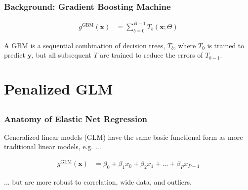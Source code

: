 \documentclass[11pt,aspectratio=169,hyperref={colorlinks}]{beamer}
\begin{document}
		\begin{frame}
		
			\frametitle{Background: Gradient Boosting Machine}			
				  			
			\begin{equation}
			\begin{aligned}\label{eq:gbm}
			g^{\text{GBM}}(\mathbf{x}) &= \sum_{b=0}^{B-1} T_b\left(\mathbf{x}; \Theta\right)
			\end{aligned}
			\end{equation}
			
			\vspace{20pt}
			
			A GBM is a sequential combination of decision trees, $T_b$, where $T_0$ is trained to predict $\mathbf{y}$, but all subsequent $T$ are trained to reduce the errors of $T_{b-1}$.
			
		\end{frame}	
					
	\section{Penalized GLM}
	
		\subsection*{}


		\begin{frame}
	
		\frametitle{Anatomy of Elastic Net Regression}	
				
		Generalized linear models (GLM) have the same basic functional form as more traditional linear models, e.g. ...
				
		\begin{equation}
			\begin{aligned}\label{eq:gbm}
			g^{\text{GLM}}(\mathbf{x}) &= \beta_0 + \beta_1 x_0 + \beta_2 x_1 + \dots + \beta_P x_{P-1}
			\end{aligned}
		\end{equation}	
		
		\vspace{10pt}... but are more robust to correlation, wide data, and outliers.
		
		\end{frame}
\end{document}
